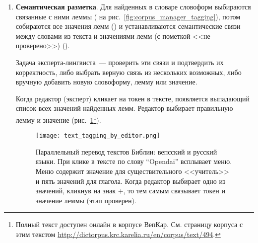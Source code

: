 \begin{enumerate}
\item \textbf{Семантическая разметка}. 
Для найденных в словаре словоформ выбираются связанные с ними леммы ( 
на рис.~\ref{fig:corpus_manager_tagging}), 
потом собираются все значения лемм () 
и устанавливаются семантические связи между словами из текста 
и значениями лемм (с пометкой <<не проверено>>) (). 




Задача эксперта-лингвиста~--- проверить эти связи и подтвердить их корректность, 
либо выбрать верную связь из нескольких возможных, 
либо вручную добавить новую словоформу, лемму или значение. 

Когда редактор (эксперт) кликает на токен в тексте, 
появляется выпадающий список всех значений найденных лемм. 
Редактор выбирает правильную лемму и значение (рис.~\ref{fig:text_tagging_by_editor}\footnote{
Полный текст доступен онлайн в корпусе ВепКар. 
См. страницу корпуса с этим текстом \url{http://dictorpus.krc.karelia.ru/en/corpus/text/494}.}). 

% 
\begin{figure}
    \centering
    \texttt{[image: text\_tagging\_by\_editor.png]}
\caption[Параллельный перевод текстов Библии]{Параллельный перевод текстов Библии: вепсский и русский языки. 
При клике в тексте по слову ``Opendai'' всплывает меню. 
Меню содержит значение для существительного <<учитель>> и пять значений для глагола. 
Когда редактор выбирает одно из значений, кликнув на знак $+$, 
то тем самым связывает токен и значение леммы ({\color{red}этап  проверен}).}
 \label{fig:text_tagging_by_editor}
\end{figure}


\end{enumerate}
